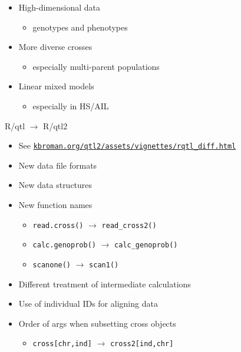 \documentclass[12pt]{article}
\newcommand{\headsize}{\fontsize{35}{35} \selectfont}
\newcommand{\smallsize}{\fontsize{25}{30} \selectfont}
\newcommand{\smallersize}{\fontsize{20}{25} \selectfont}
\newcommand{\smallestsize}{\fontsize{18}{22} \selectfont}
\begin{document}
\hfill \begin{minipage}[t]{9.5in}
\begin{itemize}
\itemsep24pt
\setlength{\rightskip}{0pt plus 1fil} %
\item High-dimensional data
  \begin{itemize}
  \item[] {\color{myblue} \smallersize genotypes and phenotypes}
  \end{itemize}
\item More diverse crosses
  \begin{itemize}
  \item[] {\color{myblue} \smallersize especially multi-parent populations}
  \end{itemize}
\item Linear mixed models
  \begin{itemize}
  \item[] {\color{myblue} \smallersize especially in HS/AIL}
  \end{itemize}
\end{itemize} \end{minipage}


\newpage

\headsize \color{myyellow}
\hfill\begin{minipage}{5.75in}
\centering
R/qtl $\rightarrow$ R/qtl2
\end{minipage}

\vspace{1cm}

\color{mywhite} \smallsize

\hfill \begin{minipage}[t]{9.5in}
\begin{itemize}
\setlength{\rightskip}{0pt plus 1fil} %
\item See
  \href{http://kbroman.org/qtl2/assets/vignettes/rqtl_diff.html}{\smallestsize
    \tt kbroman.org/qtl2/assets/vignettes/rqtl\_diff.html}
\item New data file formats
\item New data structures
\item New function names
  \begin{itemize}
  \item[] {\color{myblue} \smallersize \verb|read.cross()| $\rightarrow$ \verb|read_cross2()|}
  \item[] {\color{myblue} \smallersize \verb|calc.genoprob()| $\rightarrow$ \verb|calc_genoprob()|}
  \item[] {\color{myblue} \smallersize \verb|scanone()| $\rightarrow$ \verb|scan1()|}
  \end{itemize}
\item Different treatment of intermediate calculations
\item Use of individual IDs for aligning data
\item Order of args when subsetting cross objects
  \begin{itemize}
  \item[] {\color{myblue} \smallersize \verb|cross[chr,ind]| $\rightarrow$ \verb|cross2[ind,chr]|}
  \end{itemize}
\end{itemize} \end{minipage}
\end{document}
